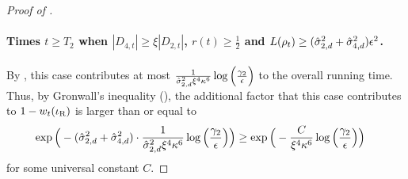 \begin{proof}[Proof of ]
\paragraph{Times $t \geq T_2$ when $|D_{4, t}| \geq \xi |D_{2, t}|$, $r(t) \geq \frac{1}{2}$ and $L(\rho_t) \geq (\hat{\sigma}_{2, d}^2 + \hat{\sigma}_{4, d}^2) \epsilon^2$.} By , this case contributes at most $\frac{1}{\hat{\sigma}_{2, d}^2 \xi^4 \kappa^6} \log\Big(\frac{\gamma_2}{\epsilon}\Big)$ to the overall running time. Thus, by Gronwall's inequality (), the additional factor that this case contributes to $1 - w_t(\iota_{\textup{R}})$ is larger than or equal to
\begin{align}
\exp\Big(-(\hat{\sigma}_{2, d}^2 + \hat{\sigma}_{4, d}^2) \cdot \frac{1}{\hat{\sigma}_{2, d}^2 \xi^4 \kappa^6} \log\Big(\frac{\gamma_2}{\epsilon}\Big) \Big)
& \geq \exp\Big(-\frac{C}{\xi^4 \kappa^6} \log \Big(\frac{\gamma_2}{\epsilon}\Big)\Big) \label{eq:root_big_contribution}
\end{align}
for some universal constant $C$.


\end{proof}
